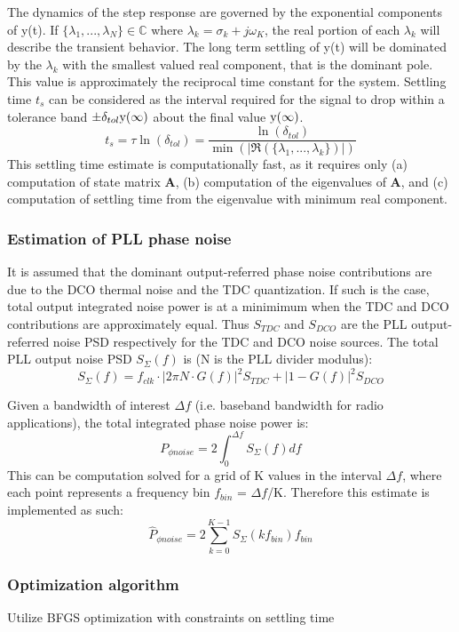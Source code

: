 
	The dynamics of the step response are governed by the exponential components of y(t). If  $\{\lambda_1, ... , \lambda_N\} \in \mathds{C}$ where $\lambda_k=\sigma_k+j\omega_K$, the real portion of each $\lambda_k$ will describe the transient behavior. The long term settling of y(t) will be dominated by the $\lambda_k$ with the smallest valued real component, that is the dominant pole. This value is approximately the reciprocal time constant for the system. Settling time $t_s$ can be considered as the interval required for the signal to drop within a tolerance band $\pm \delta_{tol} \textnormal{y}(\infty)$ about the final value $\textnormal{y}(\infty)$. 
	\begin{equation}
		t_s = \tau\ln(\delta_{tol}) = \frac{\ln(\delta_{tol})}{\min(|\Re(\{\lambda_1, ... , \lambda_k\})|)}
	\end{equation}
	This settling time estimate is computationally fast, as it requires only (a) computation of state matrix $\mathbf{A}$, (b) computation of the eigenvalues of $\mathbf{A}$, and (c) computation of settling time from the eigenvalue with minimum real component.
\subsubsection{Estimation of PLL phase noise}
	It is assumed that the dominant output-referred phase noise contributions are due to the DCO thermal noise and the TDC quantization. If such is the case, total output integrated noise power is at a minimimum when the TDC and DCO contributions are approximately equal. Thus $S_{TDC}$ and $S_{DCO}$ are the PLL output-referred noise PSD respectively for the TDC and DCO noise sources. The total PLL output noise PSD $S_{\Sigma}(f)$ is (N is the PLL divider modulus):
	\begin{equation}
		S_{\Sigma}(f) = f_{clk}\cdot|2\pi N\cdot G(f)|^2S_{TDC} + |1-G(f)|^2S_{DCO}
	\end{equation}

	Given a bandwidth of interest $\Delta f$ (i.e. baseband bandwidth for radio applications), the total integrated phase noise power is:
	\begin{equation}
		P_{\phi noise} = 2\int_0^{\Delta f} S_{\Sigma}(f)df
	\end{equation}
	This can be computation solved for a grid of K values in the interval $\Delta f$, where each point represents a frequency bin $f_{bin}$ = $\Delta f$/K. Therefore this estimate is implemented as such:
	\begin{equation}
		\hat{P}_{\phi noise} = 2\sum_{k=0}^{K-1} S_{\Sigma}(kf_{bin})f_{bin}
	\end{equation}

\subsubsection{Optimization algorithm}
	Utilize BFGS optimization with constraints on settling time
